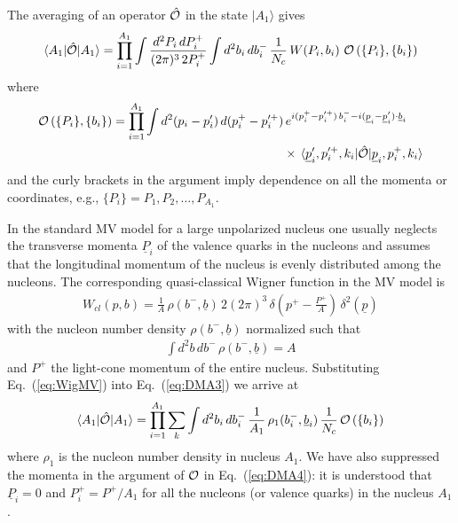 \documentclass[onecolumn,showpacs,nobibnotes,nofootinbib,12pt,aps,prd,showpacs,notitlepage,nofootinbib,preprintnumbers,amsmath,amssymb]{article}
\def\eq#1{{Eq.~(\ref{#1})}}
\newcommand{\un}[1]{\underline{#1}}
\begin{document}
The averaging of an operator $\hat {\cal O}$ in the state $| A_1
\rangle$ gives
\begin{align}\label{eq:DMA3}
  \langle A_1 | \hat {\cal O} | A_1 \rangle = \prod_{i=1}^{A_1} \int
  \frac{d^2 P_i \, dP_i^+}{(2\pi)^3\, 2 P_i^+} \int d^2 b_i \, d b_i^-
  \, \frac{1}{N_c} \, W \! \left( P_i, b_i \right) \, {\cal O} \left(
    \{ P_i \}, \{ b_i \} \right)
\end{align}
where
\begin{align}
  {\cal O} \left( \{ P_i \}, \{ b_i \} \right) = \prod_{i=1}^{A_1}
  \int d^2 (p_i - p'_i) \, d(p_i^+ - p_i^{\prime +}) & \, e^{i (p_i^+
    - p_i^{\prime +}) \, b_i^- - i (\un{p}_i - \un{p}'_i) \cdot
    \un{b}_i} \notag \\ & \times \, \langle \un{p}'_i, p_i^{\prime +},
  k_i | \hat {\cal O} | \un{p}_i, p_i^+, k_i \rangle
\end{align}
and the curly brackets in the argument imply dependence on all the
momenta or coordinates, e.g., $\{ P_i \} = P_1, P_2, \ldots ,
P_{A_1}$.

In the standard MV model for a large unpolarized nucleus one usually
neglects the transverse momenta $\un{P}_i$ of the valence quarks in
the nucleons and assumes that the longitudinal momentum of the nucleus
is evenly distributed among the nucleons. The corresponding
quasi-classical Wigner function in the MV model is
\cite{Kovchegov:2013cva}
\begin{align}
  \label{eq:WigMV}
  W_{cl} \left( p, b \right) = \frac{1}{A} \, \rho (b^-, \un{b}) \, 2
  (2 \pi)^3 \, \delta \left( p^+ - \frac{P^+}{A} \right) \, \delta^2
  (\un{p})
\end{align}
with the nucleon number density $\rho (b^-, \un{b})$ normalized such
that
\begin{align}
  \label{eq:density}
  \int d^2b \, d b^- \, \rho (b^-, \un{b}) = A 
\end{align}
and $P^+$ the light-cone momentum of the entire nucleus. Substituting
\eq{eq:WigMV} into \eq{eq:DMA3} we arrive at
\begin{align}
  \label{eq:DMA4}
  \langle A_1 | \hat {\cal O} | A_1 \rangle = \prod_{i=1}^{A_1}
  \sum_{k} \int d^2 b_i \, d b_i^- \, \frac{1}{A_1} \, \rho_1 (b_i^-,
  \un{b}_i) \, \frac{1}{N_c} \, {\cal O} \left( \{ b_i \} \right)
\end{align}
where $\rho_1$ is the nucleon number density in nucleus $A_1$. We have
also suppressed the momenta in the argument of $\cal O$ in
\eq{eq:DMA4}: it is understood that $\un{P}_i =0$ and $P^+_i =
P^+/A_1$ for all the nucleons (or valence quarks) in the nucleus
$A_1$.
\end{document}

